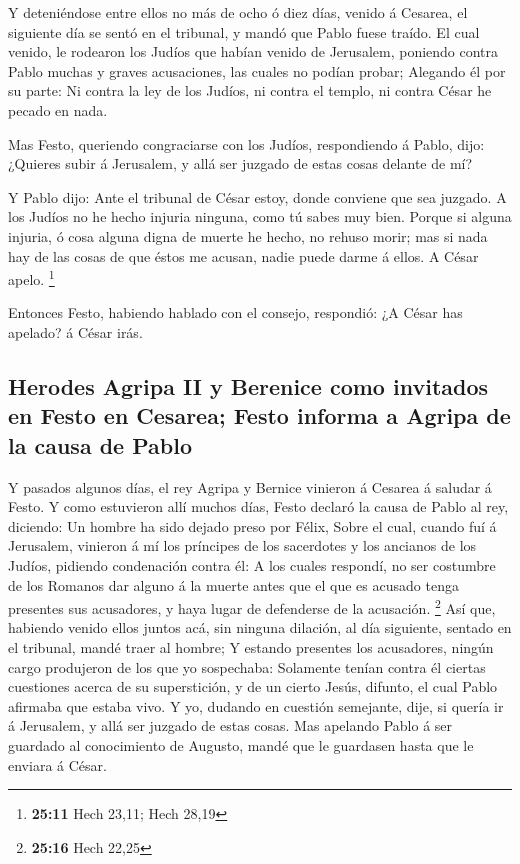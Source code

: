  Y deteniéndose entre ellos no más de ocho ó diez días,
venido á Cesarea, el siguiente día se sentó en el tribunal, y mandó que
Pablo fuese traído.  El cual venido, le rodearon los Judíos
que habían venido de Jerusalem, poniendo contra Pablo muchas y graves
acusaciones, las cuales no podían probar;  Alegando él por
su parte: Ni contra la ley de los Judíos, ni contra el templo, ni contra
César he pecado en nada.

 Mas Festo, queriendo congraciarse con los Judíos,
respondiendo á Pablo, dijo: ¿Quieres subir á Jerusalem, y allá ser
juzgado de estas cosas delante de mí?

 Y Pablo dijo: Ante el tribunal de César estoy, donde
conviene que sea juzgado. A los Judíos no he hecho injuria ninguna, como
tú sabes muy bien.  Porque si alguna injuria, ó cosa alguna
digna de muerte he hecho, no rehuso morir; mas si nada hay de las cosas
de que éstos me acusan, nadie puede darme á ellos. A César apelo.
\footnote{\textbf{25:11} Hech 23,11; Hech 28,19}

 Entonces Festo, habiendo hablado con el consejo,
respondió: ¿A César has apelado? á César irás.

\hypertarget{herodes-agripa-ii-y-berenice-como-invitados-en-festo-en-cesarea-festo-informa-a-agripa-de-la-causa-de-pablo}{%
\subsection{Herodes Agripa II y Berenice como invitados en Festo en
Cesarea; Festo informa a Agripa de la causa de
Pablo}\label{herodes-agripa-ii-y-berenice-como-invitados-en-festo-en-cesarea-festo-informa-a-agripa-de-la-causa-de-pablo}}

 Y pasados algunos días, el rey Agripa y Bernice vinieron á
Cesarea á saludar á Festo.  Y como estuvieron allí muchos
días, Festo declaró la causa de Pablo al rey, diciendo: Un hombre ha
sido dejado preso por Félix,  Sobre el cual, cuando fuí á
Jerusalem, vinieron á mí los príncipes de los sacerdotes y los ancianos
de los Judíos, pidiendo condenación contra él:  A los
cuales respondí, no ser costumbre de los Romanos dar alguno á la muerte
antes que el que es acusado tenga presentes sus acusadores, y haya lugar
de defenderse de la acusación. \footnote{\textbf{25:16} Hech 22,25}
 Así que, habiendo venido ellos juntos acá, sin ninguna
dilación, al día siguiente, sentado en el tribunal, mandé traer al
hombre;  Y estando presentes los acusadores, ningún cargo
produjeron de los que yo sospechaba:  Solamente tenían
contra él ciertas cuestiones acerca de su superstición, y de un cierto
Jesús, difunto, el cual Pablo afirmaba que estaba vivo.  Y
yo, dudando en cuestión semejante, dije, si quería ir á Jerusalem, y
allá ser juzgado de estas cosas.  Mas apelando Pablo á ser
guardado al conocimiento de Augusto, mandé que le guardasen hasta que le
enviara á César.


